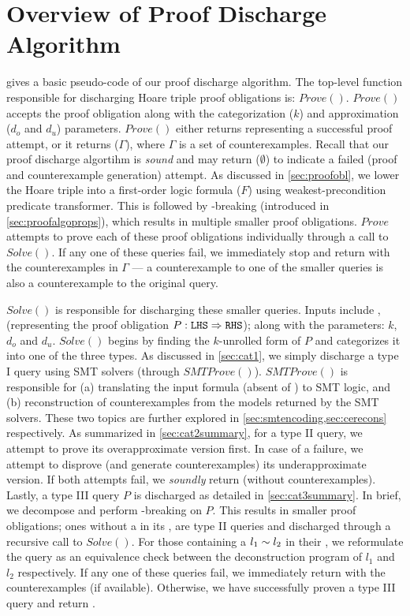 \section{Overview of Proof Discharge Algorithm}
 gives a basic pseudo-code of our proof discharge algorithm.
The top-level function responsible for discharging Hoare triple proof obligations is: $Prove()$.
$Prove()$ accepts the proof obligation along with the categorization ($k$)
and approximation ($d_o$ and $d_u$) parameters.
$Prove()$ either returns  representing a successful proof attempt,
or it returns ($\Gamma$), where $\Gamma$ is a set of counterexamples.
Recall that our proof discharge algortihm is {\em sound} and may return ($\emptyset$)
to indicate a failed (proof and counterexample generation) attempt.
As discussed in \cref{sec:proofobl}, we lower the Hoare triple into a first-order logic
formula ($F$) using weakest-precondition predicate transformer.
This is followed by \rhs{}-breaking (introduced in \cref{sec:proofalgoprops}),
which results in multiple smaller proof obligations.
$Prove{}$ attempts to prove each of these proof obligations individually through a call to $Solve()$.
If any one of these queries fail, we immediately stop and return  with the
counterexamples in $\Gamma$ --- a counterexample to one of the smaller queries is also a counterexample
to the original query.

$Solve()$ is responsible for discharging these smaller queries.
Inputs include \lhs{}, \rhs{} (representing the proof obligation $P :{\tt LHS}{} \Rightarrow {\tt RHS}{}$);
along with the parameters: $k$, $d_o$ and $d_u$.
$Solve()$ begins by finding the $k$-unrolled form of $P$ and categorizes it into one of the three types.
As discussed in \cref{sec:cat1}, we simply discharge a type I query using SMT solvers (through $SMTProve()$).
$SMTProve()$ is responsible for (a) translating the input formula (absent of \recursiveRelations{})
to SMT logic, and (b) reconstruction of counterexamples from the models returned by the SMT solvers.
These two topics are further explored in \cref{sec:smtencoding,sec:cerecons} respectively.
As summarized in \cref{sec:cat2summary}, for a type II query, we attempt to prove its
overapproximate version first.
In case of a failure, we attempt to disprove (and generate counterexamples) its underapproximate version.
If both attempts fail, we {\em soundly} return  (without counterexamples).
Lastly, a type III query $P$ is discharged as detailed in \cref{sec:cat3summary}.
In brief, we decompose and perform \rhs{}-breaking on $P$.
This results in smaller proof obligations; ones without a \recursiveRelation{} in its \rhs{},
are type II queries and discharged through a recursive call to $Solve()$.
For those containing a \recursiveRelation{} $l_1 \sim{} l_2$ in their \rhs{}, we reformulate the query as an
equivalence check between the deconstruction program of $l_1$ and $l_2$ respectively.
If any one of these queries fail, we immediately return  with the counterexamples (if available).
Otherwise, we have successfully proven a type III query and return .
